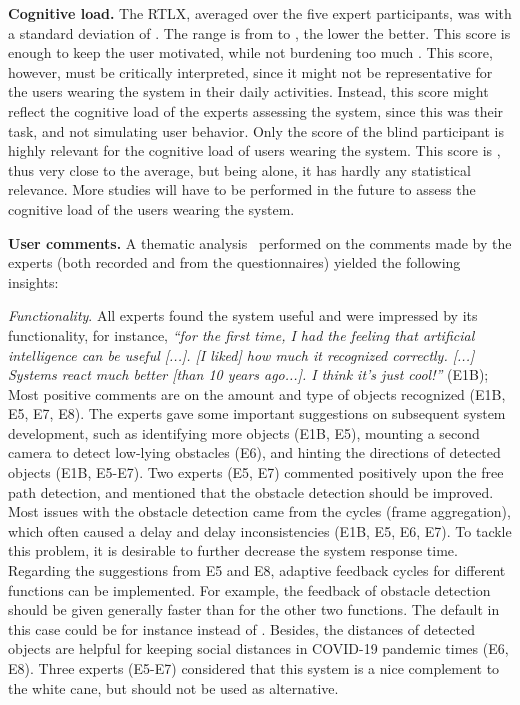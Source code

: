 \documentclass[journal]{IEEEtran}
\begin{document}
\noindent\textbf{Cognitive load.}
The RTLX, averaged over the five expert participants, was  with a standard deviation of . The range is from  to , the lower the better. This score is enough to keep the user motivated, while not burdening too much \cite{martinez2020helping}. 
This score, however, must be critically interpreted, since it might not be representative for the users wearing the system in their daily activities. Instead, this score might reflect the cognitive load of the experts assessing the system,
since this was their task, and not simulating user behavior. Only the score of the blind participant is highly relevant for the cognitive load of users wearing the system. This score is , thus very close to the average, but being alone, it has hardly any statistical relevance. More studies will have to be performed in the future to assess the cognitive load of the users wearing the system.

\noindent\textbf{User comments.}
A thematic analysis~\cite{Braun2006using} performed on the comments made by the experts (both recorded and from the questionnaires) yielded the following insights:

\emph{Functionality}. All experts found the system useful and were impressed by its functionality, for instance,
\emph{``for the first time, I had the feeling that artificial intelligence can be useful [...]. [I liked] how much it recognized correctly. [...] Systems react much better [than 10 years ago...]. I think it's just cool!''} (E1B);
Most positive comments are on the amount and type of objects recognized (E1B, E5, E7, E8).
The experts gave some important suggestions on subsequent system development, such as identifying more objects (E1B, E5), mounting a second camera to detect low-lying obstacles (E6), and hinting the directions of detected objects (E1B, E5-E7).
Two experts (E5, E7) commented positively upon the free path detection, and mentioned that the obstacle detection should be improved. 
Most issues with the obstacle detection came from the  cycles (frame aggregation), which often caused a delay and delay inconsistencies (E1B, E5, E6, E7). To tackle this problem, it is desirable to further decrease the system response time. Regarding the suggestions from E5 and E8, adaptive feedback cycles for different functions can be implemented.
For example, the feedback of obstacle detection should be given generally faster than for the other two functions. The default in this case could be for instance  instead of .
Besides, the distances of detected objects are helpful for keeping social distances in COVID-19 pandemic times (E6, E8).
Three experts (E5-E7) considered that this system is a nice complement to the white cane, but should not be used as alternative.
    
\end{document}
